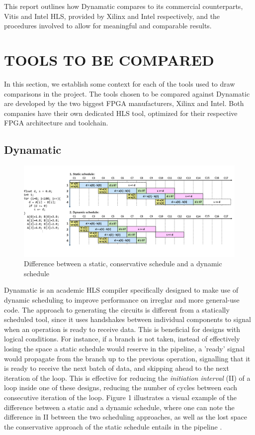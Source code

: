 \documentclass[final,5p,times,twocolumn]{elsarticle}
\begin{document}
\begin{spacing}{1.125}
This report outlines how Dynamatic compares to its commercial counterparts, Vitis and Intel HLS, provided by Xilinx and Intel respectively, and the procedures involved to allow for meaningful and comparable results.

\section{TOOLS TO BE COMPARED}
In this section, we establish some context for each of the tools used to draw comparisons in the project. The tools chosen to be compared against Dynamatic are developed by the two biggest FPGA manufacturers, Xilinx and Intel. Both companies have their own dedicated HLS tool, optimized for their respective FPGA architecture and toolchain.

\subsection{Dynamatic}
\begin{figure}
	\centering 
	\includegraphics[width=6.2in\textwidth]{schedules-cropped.png}	
	\caption{Difference between a static, conservative schedule and a dynamic schedule} 
	\label{fig_mom0}%
\end{figure}

Dynamatic is an academic HLS compiler specifically designed to make use of dynamic scheduling to improve performance on irreglar and more general-use code. The approach to generating the circuits is different from a statically scheduled tool, since it uses handshakes between individual components to signal when an operation is ready to receive data. This is beneficial for designs with logical conditions. For instance, if a branch is not taken, instead of effectively losing the space a static schedule would reserve in the pipeline, a 'ready' signal would propagate from the branch up to the previous operation, signalling that it is ready to receive the next batch of data, and skipping ahead to the next iteration of the loop. This is effective for reducing the \textit{initiation interval} (II) of a loop inside one of these designs, reducing the number of cycles between each consecutive iteration of the loop. Figure 1 illustrates a visual example of the difference between a static and a dynamic schedule, where one can note the difference in II between the two scheduling approaches, as well as the lost space the conservative approach of the static schedule entails in the pipeline \cite{dyn_tut}.


\end{spacing}
\end{document}
